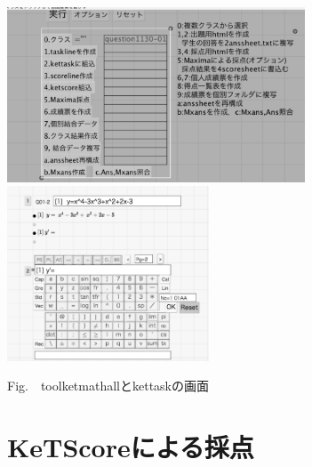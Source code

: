 \documentclass[a4j,12pt]{ujarticle}
\begin{document}
\begin{center}
\includegraphics[bb=0.00 0.00 792.00 464.00,height=52mm]{fig/toolketmathbw.pdf}
\hspace{5mm}%
\includegraphics[bb=0.00 0.00 803.00 694.00,height=52mm]{fig/kettaskbw.pdf}
\addtocounter{figure}{1}Fig.\thefigure\ \ toolketmathallとkettaskの画面\vspace{-1mm}
\end{center}

\section{KeTScoreによる採点}
\end{document}
